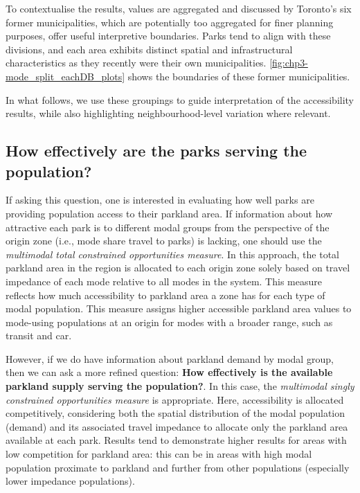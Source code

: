 \documentclass[
11pt, %
oneside, %
english, %
singlespacing, %
]{macthesis} %
\begin{document}
To contextualise the results, values are aggregated and discussed by Toronto's six former municipalities, which are potentially too aggregated for finer planning purposes, offer useful interpretive boundaries. Parks tend to align with these divisions, and each area exhibits distinct spatial and infrastructural characteristics as they recently were their own municipalities. \ref{fig:chp3-mode_split_eachDB_plots} shows the boundaries of these former municipalities.

In what follows, we use these groupings to guide interpretation of the accessibility results, while also highlighting neighbourhood-level variation where relevant.

\subsection{\texorpdfstring{\textbf{How effectively are the parks serving the population?}}{How effectively are the parks serving the population?}}\label{how-effectively-are-the-parks-serving-the-population}

If asking this question, one is interested in evaluating how well parks are providing population access to their parkland area. If information about how attractive each park is to different modal groups from the perspective of the origin zone (i.e., mode share travel to parks) is lacking, one should use the \emph{multimodal total constrained opportunities measure}. In this approach, the total parkland area in the region is allocated to each origin zone solely based on travel impedance of each mode relative to all modes in the system. This measure reflects how much accessibility to parkland area a zone has for each type of modal population. This measure assigns higher accessible parkland area values to mode-using populations at an origin for modes with a broader range, such as transit and car.

However, if we do have information about parkland demand by modal group, then we can ask a more refined question: \textbf{How effectively is the available parkland supply serving the population?}. In this case, the \emph{multimodal singly constrained opportunities measure} is appropriate. Here, accessibility is allocated competitively, considering both the spatial distribution of the modal population (demand) and its associated travel impedance to allocate only the parkland area available at each park. Results tend to demonstrate higher results for areas with low competition for parkland area: this can be in areas with high modal population proximate to parkland and further from other populations (especially lower impedance populations).
\end{document}
